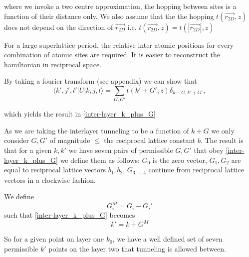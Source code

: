 \documentclass[12pt]{report} %
\begin{document}
  where we invoke a two centre approximation, the hopping between sites is a function of their distance only. We also assume that the the hopping $t(\vec{r_{2D}}, z)$ does not depend on the direction of $\vec{r_{2D}}$ i.e. $t(\vec{r_{2D}}, z) = t(|\vec{r_{2D}}|, z)$

  For a large superlattice period, the relative inter atomic positions for every combination of atomic sites are required. It is easier to reconstruct the hamiltonian in reciprocal space.

  By taking a fourier transform (see appendix) we can show that
  \begin{equation}
    \langle k',j',l' | U | k, j, l \rangle = \sum_{G, G'} t(k'+G', z) \delta_{k-G, k'+G'},
    \label{inter-layer_hopping_elements}
  \end{equation}
  
  which yields the result in \ref{inter-layer_k_plus_G}
  
  As we are taking the interlayer tunneling to be a function of $k+G$ we only consider $G, G'$ of magnitude $\leq$ the reciprocal lattice constant $b$. The result is that for a given $k, k'$ we have seven pairs of permissible $G, G'$ that obey \ref{inter-layer_k_plus_G} we define them as follows: $G_0$ is the zero vector, $G_1, G_2$ are equal to reciprocal lattice vectors $b_1, b_2$, $G_{3,\cdots,4}$ continue from reciprocal lattice vectors in a clockwise fashion.

  We define
  \begin{equation}
    G_i^M = G_i - G_i'
    \label{inter-layer_G_M_def}
  \end{equation}
  such that \ref{inter-layer_k_plus_G} becomes
  \begin{equation}
    k' = k + G^M
    \label{inter-layer_k_plus_G_M}
  \end{equation}

  So for a given point on layer one $k_0$, we have a well defined set of seven permissible $k'$ points on the layer two that tunneling is allowed between.
\end{document}
